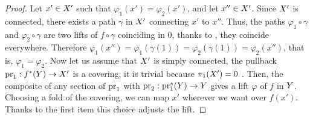 \begin{proof}
  Let $x' \in X'$ such that $\varphi_1(x') = \varphi_2(x')$,
  and let $x'' \in X'$.
  Since $X'$ is connected,
  there exists a path
  $\gamma$ in $X'$ connecting $x'$ to $x''$.
  Thus,
  the paths $\varphi_1 \circ \gamma$ and $\varphi_2 \circ \gamma$ are two lifts of $f \circ \gamma$ coinciding in $0$,
  thanks to ,
  they coincide everywhere.
  Therefore $\varphi_1(x'') = \varphi_1(\gamma(1)) =  \varphi_2(\gamma(1)) = \varphi_2(x'')$,
  that is,
  $\varphi_1 = \varphi_2$.
  Now let us assume that $X'$ is simply connected,
  the pullback $\mathrm{pr}_1 : f^*(Y) \to X'$ is a covering,
  it is trivial because $\pi_1(X') = 0$ .
  Then,
  the composite of any section of $\mathrm{pr}_1$ with $\mathrm{pr}_2 : \mathrm{pr}_1^*(Y) \to Y$ gives a lift $\varphi$ of $f$ in $Y$.
  Choosing a fold of the covering,
  we can map $x'$ wherever we want over $f(x')$.
  Thanks to the first item this choice adjusts the lift.
\end{proof}

